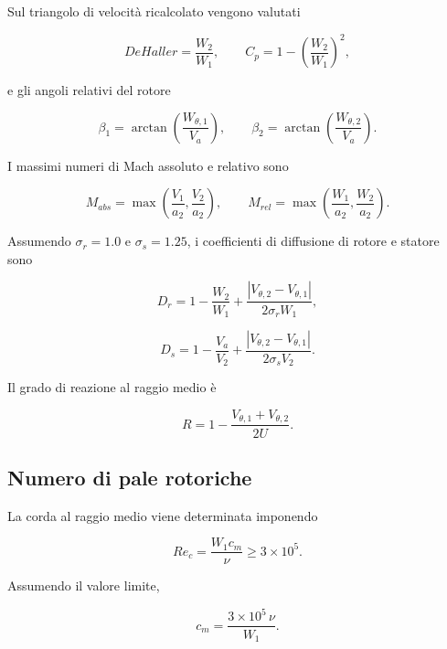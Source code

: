 Sul triangolo di velocità ricalcolato vengono valutati

\begin{equation*}
DeHaller=\frac{W_2}{W_1},
\qquad
C_p=1-\left(\frac{W_2}{W_1}\right)^2,
\end{equation*}

e gli angoli relativi del rotore

\begin{equation*}
\beta_1=\arctan\left(\frac{W_{\theta,1}}{V_a}\right),
\qquad
\beta_2=\arctan\left(\frac{W_{\theta,2}}{V_a}\right).
\end{equation*}

I massimi numeri di Mach assoluto e relativo sono

\begin{equation*}
M_{abs}=
\max\left(\frac{V_1}{a_2},\frac{V_2}{a_2}\right),
\qquad
M_{rel}=
\max\left(\frac{W_1}{a_2},\frac{W_2}{a_2}\right).
\end{equation*}

Assumendo $\sigma_r=1.0$ e $\sigma_s=1.25$, i coefficienti di
diffusione di rotore e statore sono

\begin{equation*}
D_r=
1-\frac{W_2}{W_1}
+
\frac{|V_{\theta,2}-V_{\theta,1}|}
{2\sigma_r W_1},
\end{equation*}

\begin{equation*}
D_s=
1-\frac{V_a}{V_2}
+
\frac{|V_{\theta,2}-V_{\theta,1}|}
{2\sigma_s V_2}.
\end{equation*}

Il grado di reazione al raggio medio è

\begin{equation*}
R=
1-\frac{V_{\theta,1}+V_{\theta,2}}{2U}.
\end{equation*}


\subsection{Numero di pale rotoriche}

La corda al raggio medio viene determinata imponendo

\begin{equation*}
Re_c=\frac{W_1c_m}{\nu}\geq 3\times10^5.
\end{equation*}

Assumendo il valore limite,

\begin{equation*}
c_m=\frac{3\times10^5\,\nu}{W_1}.
\end{equation*}

